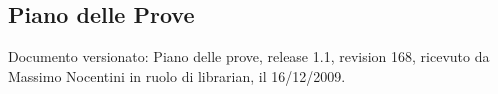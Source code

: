 \subsection{Piano delle Prove}
Documento versionato: Piano delle prove, release 1.1, revision 168, ricevuto da
Massimo Nocentini in ruolo di librarian, il 16/12/2009.